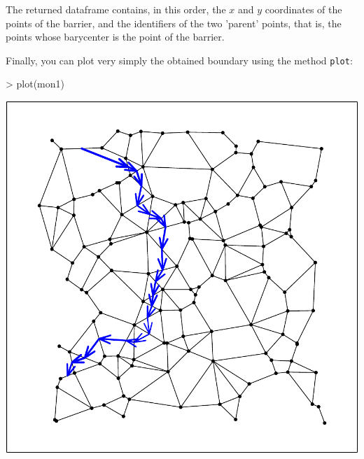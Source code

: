 \documentclass{article}
\begin{document}
\noindent The returned dataframe contains, in this order, the $x$ and
$y$ coordinates of the points of the barrier, and the identifiers of
the two 'parent' points, that is, the points whose barycenter is the
point of the barrier.

Finally, you can plot very simply the obtained boundary using the method \texttt{plot}:
\begin{Schunk}
\begin{Sinput}
> plot(mon1)
\end{Sinput}
\end{Schunk}
\includegraphics{figs/base-098}
\end{document}

